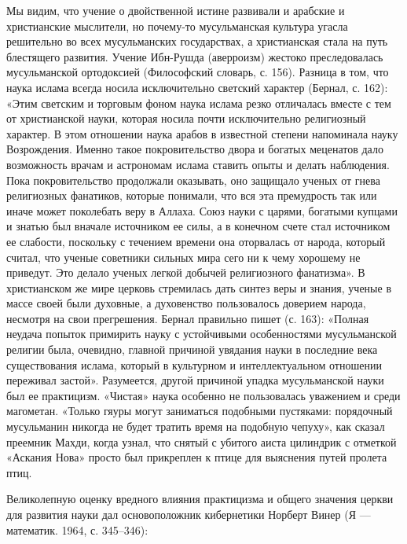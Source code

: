 Мы  видим, что  учение о  двойственной истине  развивали и  арабские и
христианские  мыслители, но  почему-то  мусульманская культура  угасла
решительно во  всех мусульманских  государствах, а  христианская стала
на  путь блестящего  развития.  Учение  Ибн-Рушда (аверроизм)  жестоко
преследовалась  мусульманской  ортодоксией  (Философский  словарь,  с.
156).  Разница в  том, что  наука ислама  всегда носила  исключительно
светский  характер  (Бернал,  с.   162):  «Этим  светским  и  торговым
фоном  наука ислама  резко  отличалась вместе  с  тем от  христианской
науки,  которая носила  почти  исключительно  религиозный характер.  В
этом  отношении  наука арабов  в  известной  степени напоминала  науку
Возрождения. Именно  такое покровительство  двора и  богатых меценатов
дало возможность  врачам и  астрономам ислама  ставить опыты  и делать
наблюдения.  Пока покровительство  продолжали оказывать,  оно защищало
ученых от гнева  религиозных фанатиков, которые понимали,  что вся эта
премудрость так или иначе может поколебать веру в Аллаха. Союз науки с
царями, богатыми купцами и знатью был  вначале источником ее силы, а в
конечном  счете  стал источником  ее  слабости,  поскольку с  течением
времени она оторвалась от народа, который считал, что ученые советники
сильных  мира  сего  ни  к  чему  хорошему  не  приведут.  Это  делало
ученых  легкой  добычей  религиозного фанатизма».  В  христианском  же
мире  церковь стремилась  дать синтез  веры и  знания, ученые  в массе
своей  были  духовные,  а духовенство  пользовалось  доверием  народа,
несмотря  на  свои  прегрешения.  Бернал  правильно  пишет  (с.  163):
«Полная неудача  попыток примирить  науку с  устойчивыми особенностями
мусульманской  религии  была,   очевидно,  главной  причиной  увядания
науки  в последние  века  существования ислама,  который в  культурном
и  интеллектуальном отношении  переживал  застой». Разумеется,  другой
причиной упадка мусульманской науки  был ее практицизм. «Чистая» наука
особенно не  пользовалась уважением  и среди магометан.  «Только гяуры
могут заниматься  подобными пустяками: порядочный  мусульманин никогда
не будет тратить время на подобную чепуху», как сказал преемник Махди,
когда узнал, что снятый с  убитого аиста цилиндрик с отметкой «Аскания
Нова» просто был прикреплен к птице для выяснения путей пролета птиц.

Великолепную  оценку вредного  влияния практицизма  и общего  значения
церкви для развития науки дал основоположник кибернетики Норберт Винер
(Я --- математик. 1964, с. 345--346):

